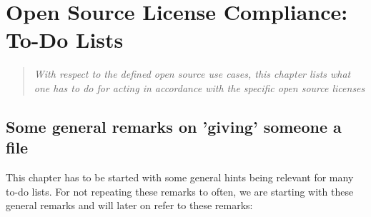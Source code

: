 %
%
%
%
%


\chapter{Open Source License Compliance: To-Do Lists}

\footnotesize
\begin{quote}\itshape
With respect to the defined open source use cases, this chapter lists what one
has to do for acting in accordance with the specific open source licenses
\end{quote}
\normalsize{}

\section{Some general remarks on 'giving' someone a file}

This chapter has to be started with some general hints being relevant for many
to-do lists. For not repeating these remarks to often, we are starting
with these general remarks and will later on refer to these remarks:

